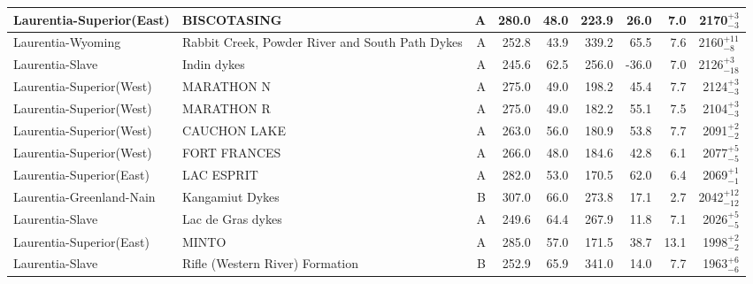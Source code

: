 \begin{longtable}{p{1 in}p{1 in}rrrrrrr}
      Laurentia-Superior(East) &                                        BISCOTASING &      A &     280.0 &      48.0 & 223.9 &  26.0 &       7.0 &     2170$^{+3}_{-3}$ \\ \hline
             Laurentia-Wyoming &    Rabbit Creek, Powder River and South Path Dykes &      A &     252.8 &      43.9 & 339.2 &  65.5 &       7.6 &    2160$^{+11}_{-8}$ \\ \hline
               Laurentia-Slave &                                        Indin dykes &      A &     245.6 &      62.5 & 256.0 & -36.0 &       7.0 &    2126$^{+3}_{-18}$ \\ \hline
      Laurentia-Superior(West) &                                         MARATHON N &      A &     275.0 &      49.0 & 198.2 &  45.4 &       7.7 &     2124$^{+3}_{-3}$ \\ \hline
      Laurentia-Superior(West) &                                         MARATHON R &      A &     275.0 &      49.0 & 182.2 &  55.1 &       7.5 &     2104$^{+3}_{-3}$ \\ \hline
      Laurentia-Superior(West) &                                       CAUCHON LAKE &      A &     263.0 &      56.0 & 180.9 &  53.8 &       7.7 &     2091$^{+2}_{-2}$ \\ \hline
      Laurentia-Superior(West) &                                       FORT FRANCES &      A &     266.0 &      48.0 & 184.6 &  42.8 &       6.1 &     2077$^{+5}_{-5}$ \\ \hline
      Laurentia-Superior(East) &                                         LAC ESPRIT &      A &     282.0 &      53.0 & 170.5 &  62.0 &       6.4 &     2069$^{+1}_{-1}$ \\ \hline
      Laurentia-Greenland-Nain &                                    Kangamiut Dykes &      B &     307.0 &      66.0 & 273.8 &  17.1 &       2.7 &   2042$^{+12}_{-12}$ \\ \hline
               Laurentia-Slave &                                  Lac de Gras dykes &      A &     249.6 &      64.4 & 267.9 &  11.8 &       7.1 &     2026$^{+5}_{-5}$ \\ \hline
      Laurentia-Superior(East) &                                              MINTO &      A &     285.0 &      57.0 & 171.5 &  38.7 &      13.1 &     1998$^{+2}_{-2}$ \\ \hline
               Laurentia-Slave &                    Rifle (Western River) Formation &      B &     252.9 &      65.9 & 341.0 &  14.0 &       7.7 &     1963$^{+6}_{-6}$ \\ \hline

\end{longtable}
